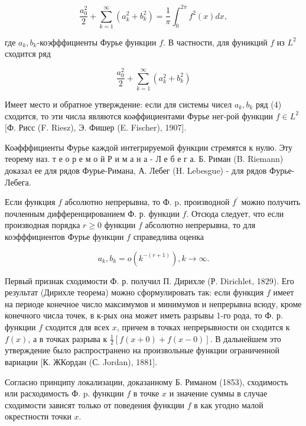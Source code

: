 \documentclass[10pt]{article}
\begin{document}
\[

\frac{a_{0}^{2}}{2}+\sum_{k=1}^{\infty}\left(a_{k}^{2}+b_{k}^{2}\right)=\frac{1}{\pi} \int_{0}^{2 \pi} f^{2}(x) d x,

\]



где $a_{k}, b_{k}$-коэфффициенты Фурье функции $f$. В частности, для фуникций $f$ из $L^{2}$ сходится ряд



\[

\frac{a_{0}^{2}}{2}+\sum_{k=1}^{\infty}\left(a_{k}^{2}+b_{k}^{2}\right)

\]



Имеет место и обратное утверждение: если для системы чисел $a_{k}, b_{k}$ ряд (4) сходится, то эти числа являются коәффициентами Фурье нег-рой функции $f \in L^{2}$ [Ф. Рисс (F. Riesz), Э. Фишер (E. Fischer), 1907].



Коәфффициенты Фурье каждой интегрируемой функции стремятся к нулю. Эту теорему наз. т е о р е м о й Р и м а н а - Л е б е г а. Б. Риман (B. Riemann) доказал ее для рядов Фурье-Римана, А. Лебег (H. Lebesgue) - для рядов Фурье-Лебега.



Если функция $f$ абсолютно непрерывна, то Ф. p. производной $f^{\prime}$ можно получить почленным дифференцированием Ф. р. функции $f$. Отсюда следует, что если производная порядка $r \geqslant 0$ функции $f$ абсолютно непрерывна, то для коэфффициентов Фурье функции $f$ справедлива оценка



\[

a_{k}, b_{k}=o\left(k^{-(r+1)}\right), k \longrightarrow \infty .

\]



Первый признак сходимости Ф. р. получил П. Дирихле (Р. Dirichlet, 1829). Его результат (Дирихле теорема) можно сформулировать так: если функция $f$ имеет на периоде конечное число максимумов и минимумов и непрерывна всюду, кроме конечного числа точек, в к-рых она может иметь разрывы 1-го рода, то Ф. р. функции $f$ сходится для всех $x$, причем в точках непрерывности он сходится к $f(x)$, а в точках разрыва к $\frac{1}{2}[f(x+0)+f(x-0)]$. В дальнейшем это утверждение было распространено на произвольные функции ограниченной вариации [К. ЖКордан (С. Jordan), 1881].



Согласно принципу локализации, доказанному Б. Риманом (1853), сходимость или расходимость Ф. p. функции $f$ в точке $x$ и значение суммы в случае сходимости зависят только от поведения функции $f$ в как угодно малой окрестности точки $x$.
\end{document}

